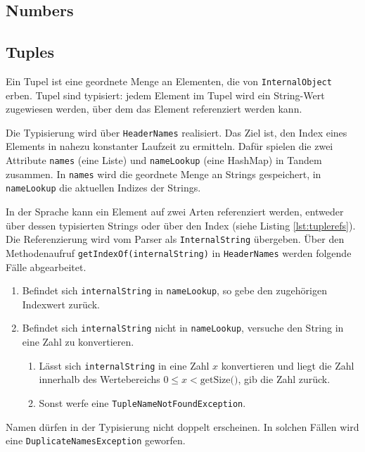 \subsection{Numbers}

\subsection{Tuples}

Ein Tupel ist eine geordnete Menge an Elementen, die von \lstinline{InternalObject} erben.
Tupel sind typisiert: jedem Element im Tupel wird ein String-Wert zugewiesen werden, über dem
das Element referenziert werden kann.

Die Typisierung wird über \lstinline{HeaderNames} realisiert. Das Ziel ist, den Index
eines Elements in nahezu konstanter Laufzeit zu ermitteln. Dafür spielen die zwei Attribute
\lstinline{names} (eine Liste) und \lstinline{nameLookup} (eine HashMap) in Tandem zusammen.
In \lstinline{names} wird die geordnete Menge an Strings gespeichert, in \lstinline{nameLookup}
die aktuellen Indizes der Strings.

In der Sprache kann ein Element auf zwei Arten referenziert werden, entweder über dessen typisierten Strings oder
über den Index (siehe Listing \ref{lst:tuplerefs}). Die Referenzierung wird vom Parser als \lstinline{InternalString}
übergeben. Über den Methodenaufruf \lstinline{getIndexOf(internalString)} in \lstinline{HeaderNames}
werden folgende Fälle abgearbeitet.

\begin{enumerate}
    \item Befindet sich \lstinline{internalString} in \lstinline{nameLookup}, so gebe den zugehörigen Indexwert zurück.
    \item Befindet sich \lstinline{internalString} nicht in \lstinline{nameLookup}, versuche den String in eine Zahl zu konvertieren.
    \begin{enumerate}
        \item Lässt sich \lstinline{internalString} in eine Zahl $x$ konvertieren und liegt die Zahl innerhalb des Wertebereichs $0 \leq x < \textrm{getSize()}$, gib die Zahl zurück.
        \item Sonst werfe eine \lstinline{TupleNameNotFoundException}.
    \end{enumerate}
\end{enumerate}

Namen dürfen in der Typisierung nicht doppelt erscheinen. In solchen Fällen wird eine \lstinline{DuplicateNamesException} geworfen.

